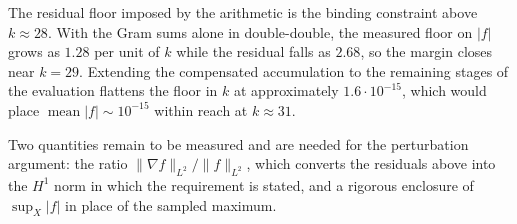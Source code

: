 \documentclass[11pt,a4paper]{article}
\begin{document}
The residual floor imposed by the arithmetic is the binding constraint above
$k\approx28$. With the Gram sums alone in double-double, the measured floor on
$|f|$ grows as $1.28$ per unit of $k$ while the residual falls as $2.68$, so the
margin closes near $k=29$. Extending the compensated accumulation to the
remaining stages of the evaluation flattens the floor in $k$ at approximately
$1.6\cdot10^{-15}$, which would place $\operatorname{mean}|f|\sim10^{-15}$ within
reach at $k\approx31$.

Two quantities remain to be measured and are needed for the perturbation
argument: the ratio $\|\nabla f\|_{L^2}/\|f\|_{L^2}$, which converts the
residuals above into the $H^1$ norm in which the requirement is stated, and a
rigorous enclosure of $\sup_X|f|$ in place of the sampled maximum.
\end{document}
